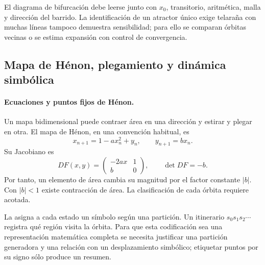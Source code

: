 \begin{warningbox}
El diagrama de bifurcación debe leerse junto con \(x_0\), transitorio, aritmética, malla y dirección del barrido. La identificación de un atractor único exige
telaraña con muchas líneas tampoco demuestra sensibilidad; para ello se comparan
órbitas vecinas o se estima expansión con control de convergencia.
\end{warningbox}


\subsection{Mapa de Hénon, plegamiento y dinámica simbólica}

\paragraph{Ecuaciones y puntos fijos de Hénon.}
Un mapa bidimensional puede contraer área en una dirección y estirar y plegar en
otra. El mapa de Hénon, en una convención habitual, es
\[
 x_{n+1}=1-a x_n^2+y_n,\qquad y_{n+1}=b x_n.
\]
Su Jacobiano es
\[
 DF(x,y)=
 \begin{pmatrix}-2ax&1\\ b&0\end{pmatrix},\qquad
 \det DF=-b.
\]
Por tanto, un elemento de área cambia su magnitud por el factor constante \(|b|\).
Con \(|b|<1\) existe contracción de área. La clasificación de cada órbita requiere
acotada.

La  asigna a cada estado un símbolo según una partición. Un
itinerario \(s_0s_1s_2\cdots\) registra qué región visita la órbita. Para que esta
codificación sea una representación matemática completa se necesita justificar una
partición generadora y una relación con un desplazamiento simbólico; etiquetar puntos
por su signo sólo produce un resumen.

